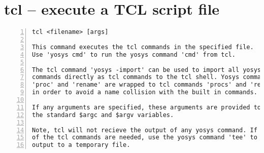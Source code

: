 \section{tcl -- execute a TCL script file}
\label{cmd:tcl}
\begin{lstlisting}[numbers=left,frame=single]
    tcl <filename> [args]

This command executes the tcl commands in the specified file.
Use 'yosys cmd' to run the yosys command 'cmd' from tcl.

The tcl command 'yosys -import' can be used to import all yosys
commands directly as tcl commands to the tcl shell. Yosys commands
'proc' and 'rename' are wrapped to tcl commands 'procs' and 'renames'
in order to avoid a name collision with the built in commands.

If any arguments are specified, these arguments are provided to the script via
the standard $argc and $argv variables.

Note, tcl will not recieve the output of any yosys command. If the output
of the tcl commands are needed, use the yosys command 'tee' to redirect yosys's
output to a temporary file.
\end{lstlisting}

